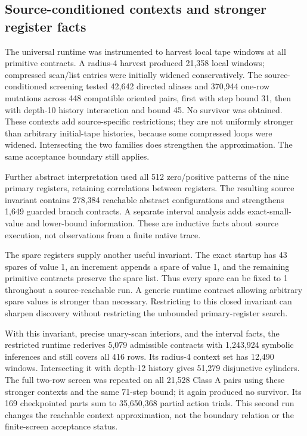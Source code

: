 \documentclass[11pt,a4paper]{article}
\begin{document}
\subsection{Source-conditioned contexts and stronger register facts}

The universal runtime was instrumented to harvest local tape windows at
all primitive contracts. A radius-4 harvest produced 21,358 local windows;
compressed scan/list entries were initially widened conservatively.
The source-conditioned screening tested 42,642 directed aliases and
370,944 one-row mutations across 448 compatible oriented pairs, first with
step bound 31, then with depth-10 history intersection and bound 45.
No survivor was obtained. These contexts add source-specific restrictions;
they are not uniformly stronger than arbitrary initial-tape histories,
because some compressed loops were widened. Intersecting the two families
does strengthen the approximation. The same acceptance boundary still applies.

Further abstract interpretation used all 512 zero/positive patterns of
the nine primary registers, retaining correlations between registers.
The resulting source invariant contains 278,384 reachable abstract
configurations and strengthens 1,649 guarded branch contracts. A separate
interval analysis adds exact-small-value and lower-bound information.
These are inductive facts about source execution, not observations from
a finite native trace.

The spare registers supply another useful invariant. The exact startup has
43 spares of value 1, an increment appends a spare of value 1, and the
remaining primitive contracts preserve the spare list. Thus every spare
can be fixed to 1 throughout a source-reachable run. A generic runtime
contract allowing arbitrary spare values is stronger than necessary.
Restricting to this closed invariant can sharpen discovery without
restricting the unbounded primary-register search.

With this invariant, precise unary-scan interiors, and the interval facts,
the restricted runtime rederives 5,079 admissible contracts with 1,243,924
symbolic inferences and still covers all 416 rows. Its radius-4 context set
has 12,490 windows. Intersecting it with depth-12 history gives 51,279
disjunctive cylinders. The full two-row screen was repeated on all 21,528
Class A pairs using these stronger contexts and the same 71-step bound;
it again produced no survivor. Its 169 checkpointed parts sum to
35,650,368 partial action trials. This second run changes the reachable
context approximation, not the boundary relation or the finite-screen
acceptance status.
\end{document}
